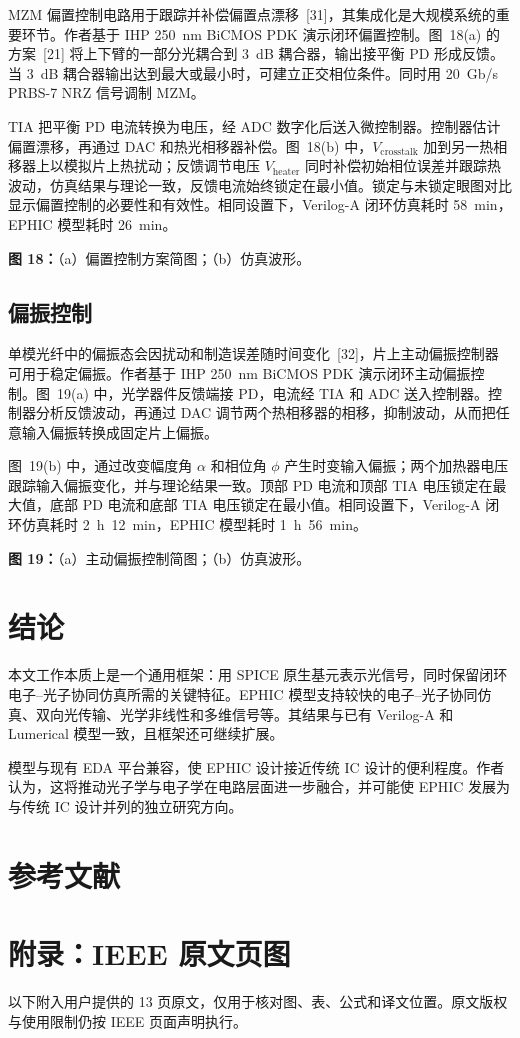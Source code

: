 \documentclass[11pt,a4paper]{ctexart}
\begin{document}
MZM 偏置控制电路用于跟踪并补偿偏置点漂移~[31]，其集成化是大规模系统的重要环节。作者基于 IHP 250~nm BiCMOS PDK 演示闭环偏置控制。图~18(a) 的方案~[21] 将上下臂的一部分光耦合到 3~dB 耦合器，输出接平衡 PD 形成反馈。当 3~dB 耦合器输出达到最大或最小时，可建立正交相位条件。同时用 20~Gb/s PRBS-7 NRZ 信号调制 MZM。

TIA 把平衡 PD 电流转换为电压，经 ADC 数字化后送入微控制器。控制器估计偏置漂移，再通过 DAC 和热光相移器补偿。图~18(b) 中，$V_{\mathrm{crosstalk}}$ 加到另一热相移器上以模拟片上热扰动；反馈调节电压 $V_{\mathrm{heater}}$ 同时补偿初始相位误差并跟踪热波动，仿真结果与理论一致，反馈电流始终锁定在最小值。锁定与未锁定眼图对比显示偏置控制的必要性和有效性。相同设置下，Verilog-A 闭环仿真耗时 58~min，EPHIC 模型耗时 26~min。

\noindent\textbf{图 18：}（a）偏置控制方案简图；（b）仿真波形。

\subsection{偏振控制}

单模光纤中的偏振态会因扰动和制造误差随时间变化~[32]，片上主动偏振控制器可用于稳定偏振。作者基于 IHP 250~nm BiCMOS PDK 演示闭环主动偏振控制。图~19(a) 中，光学器件反馈端接 PD，电流经 TIA 和 ADC 送入控制器。控制器分析反馈波动，再通过 DAC 调节两个热相移器的相移，抑制波动，从而把任意输入偏振转换成固定片上偏振。

图~19(b) 中，通过改变幅度角 $\alpha$ 和相位角 $\phi$ 产生时变输入偏振；两个加热器电压跟踪输入偏振变化，并与理论结果一致。顶部 PD 电流和顶部 TIA 电压锁定在最大值，底部 PD 电流和底部 TIA 电压锁定在最小值。相同设置下，Verilog-A 闭环仿真耗时 2~h~12~min，EPHIC 模型耗时 1~h~56~min。

\noindent\textbf{图 19：}（a）主动偏振控制简图；（b）仿真波形。

\section{结论}

本文工作本质上是一个通用框架：用 SPICE 原生基元表示光信号，同时保留闭环电子--光子协同仿真所需的关键特征。EPHIC 模型支持较快的电子--光子协同仿真、双向光传输、光学非线性和多维信号等。其结果与已有 Verilog-A 和 Lumerical 模型一致，且框架还可继续扩展。

模型与现有 EDA 平台兼容，使 EPHIC 设计接近传统 IC 设计的便利程度。作者认为，这将推动光子学与电子学在电路层面进一步融合，并可能使 EPHIC 发展为与传统 IC 设计并列的独立研究方向。

\section*{参考文献}
\small

\normalsize
\section*{附录：IEEE 原文页图}
以下附入用户提供的 13 页原文，仅用于核对图、表、公式和译文位置。原文版权与使用限制仍按 IEEE 页面声明执行。


\end{document}
